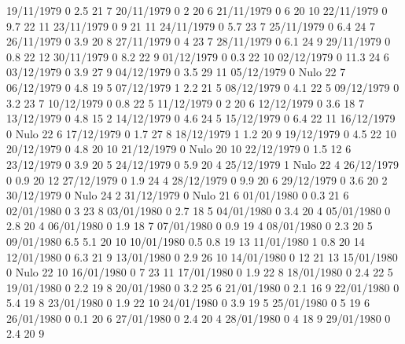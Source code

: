 19/11/1979  0      2.5    21     7 
20/11/1979  0      2      20     6 
21/11/1979  0      6      20     10 
22/11/1979  0      9.7    22     11 
23/11/1979  0      9      21     11 
24/11/1979  0      5.7    23     7 
25/11/1979  0      6.4    24     7 
26/11/1979  0      3.9    20     8 
27/11/1979  0      4      23     7 
28/11/1979  0      6.1    24     9 
29/11/1979  0      0.8    22     12 
30/11/1979  0      8.2    22     9 
01/12/1979  0      0.3    22     10 
02/12/1979  0      11.3   24     6 
03/12/1979  0      3.9    27     9 
04/12/1979  0      3.5    29     11 
05/12/1979  0     Nulo    22     7 
06/12/1979  0      4.8    19     5 
07/12/1979  1      2.2    21     5 
08/12/1979  0      4.1    22     5 
09/12/1979  0      3.2    23     7 
10/12/1979  0      0.8    22     5 
11/12/1979  0      2      20     6 
12/12/1979  0      3.6    18     7 
13/12/1979  0      4.8    15     2 
14/12/1979  0      4.6    24     5 
15/12/1979  0      6.4    22     11 
16/12/1979  0     Nulo    22     6 
17/12/1979  0      1.7    27     8 
18/12/1979  1      1.2    20     9 
19/12/1979  0      4.5    22     10 
20/12/1979  0      4.8    20     10 
21/12/1979  0     Nulo    20     10 
22/12/1979  0      1.5    12     6 
23/12/1979  0      3.9    20     5 
24/12/1979  0      5.9    20     4 
25/12/1979  1     Nulo    22     4 
26/12/1979  0      0.9    20     12 
27/12/1979  0      1.9    24     4 
28/12/1979  0      9.9    20     6 
29/12/1979  0      3.6    20     2 
30/12/1979  0     Nulo    24     2 
31/12/1979  0     Nulo    21     6 
01/01/1980  0      0.3    21     6 
02/01/1980  0      3      23     8 
03/01/1980  0      2.7    18     5 
04/01/1980  0      3.4    20     4 
05/01/1980  0      2.8    20     4 
06/01/1980  0      1.9    18     7 
07/01/1980  0      0.9    19     4 
08/01/1980  0      2.3    20     5 
09/01/1980  6.5    5.1    20     10 
10/01/1980  0.5    0.8    19     13 
11/01/1980  1      0.8    20     14 
12/01/1980  0      6.3    21     9 
13/01/1980  0      2.9    26     10 
14/01/1980  0      12     21     13 
15/01/1980  0     Nulo    22     10 
16/01/1980  0      7      23     11 
17/01/1980  0      1.9    22     8 
18/01/1980  0      2.4    22     5 
19/01/1980  0      2.2    19     8 
20/01/1980  0      3.2    25     6 
21/01/1980  0      2.1    16     9 
22/01/1980  0      5.4    19     8 
23/01/1980  0      1.9    22     10 
24/01/1980  0      3.9    19     5 
25/01/1980  0      5      19     6 
26/01/1980  0      0.1    20     6 
27/01/1980  0      2.4    20     4 
28/01/1980  0      4      18     9 
29/01/1980  0      2.4    20     9 
